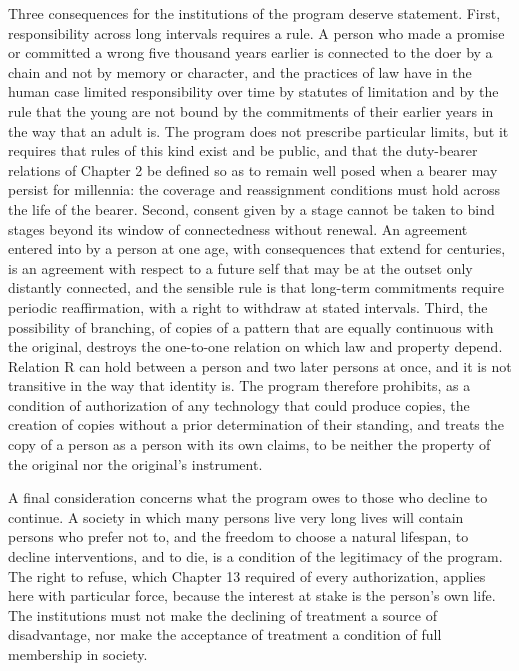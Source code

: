 Three consequences for the institutions of the program deserve statement. First, responsibility across long intervals requires a rule. A person who made a promise or committed a wrong five thousand years earlier is connected to the doer by a chain and not by memory or character, and the practices of law have in the human case limited responsibility over time by statutes of limitation and by the rule that the young are not bound by the commitments of their earlier years in the way that an adult is. The program does not prescribe particular limits, but it requires that rules of this kind exist and be public, and that the duty-bearer relations of Chapter 2 be defined so as to remain well posed when a bearer may persist for millennia: the coverage and reassignment conditions must hold across the life of the bearer. Second, consent given by a stage cannot be taken to bind stages beyond its window of connectedness without renewal. An agreement entered into by a person at one age, with consequences that extend for centuries, is an agreement with respect to a future self that may be at the outset only distantly connected, and the sensible rule is that long-term commitments require periodic reaffirmation, with a right to withdraw at stated intervals. Third, the possibility of branching, of copies of a pattern that are equally continuous with the original, destroys the one-to-one relation on which law and property depend. Relation R can hold between a person and two later persons at once, and it is not transitive in the way that identity is. The program therefore prohibits, as a condition of authorization of any technology that could produce copies, the creation of copies without a prior determination of their standing, and treats the copy of a person as a person with its own claims, to be neither the property of the original nor the original's instrument.

A final consideration concerns what the program owes to those who decline to continue. A society in which many persons live very long lives will contain persons who prefer not to, and the freedom to choose a natural lifespan, to decline interventions, and to die, is a condition of the legitimacy of the program. The right to refuse, which Chapter 13 required of every authorization, applies here with particular force, because the interest at stake is the person's own life. The institutions must not make the declining of treatment a source of disadvantage, nor make the acceptance of treatment a condition of full membership in society.

